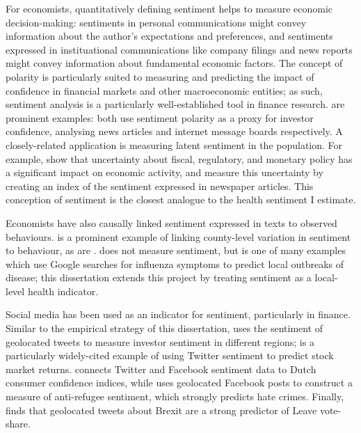 \documentclass[12pt,a4]{article}
\begin{document}
For economists, quantitatively defining sentiment helps to measure economic decision-making: sentiments in personal communications might convey information about the author's expectations and preferences, and sentiments expressed in instituational communications like company filings and news reports might convey information about fundamental economic factors. The concept of polarity is particularly suited to measuring and predicting the impact of confidence in financial markets and other macroeconomic entities; as such, sentiment analysis is a particularly well-established tool in finance research. \textcite{tetlockGivingContentInvestor2007a,antweilerAllThatTalk2004} are prominent examples: both use sentiment polarity as a proxy for investor confidence, analysing news articles and internet message boards respectively. A closely-related application is measuring latent sentiment in the population. For example, \textcite{bakerMeasuringEconomicPolicy2016} show that uncertainty about fiscal, regulatory, and monetary policy has a significant impact on economic activity, and measure this uncertainty by creating an index of the sentiment expressed in newspaper articles. This conception of sentiment is the closest analogue to the health sentiment I estimate.

Economists have also causally linked sentiment expressed in texts to observed behaviours. \textcite{stephens-davidowitzCostRacialAnimus2014} is a prominent example of linking county-level variation in sentiment to behaviour, as are \textcite{choiPredictingPresentGoogle2012,saizProxyingUnobservableVariables2013}. \textcite{ginsbergDetectingInfluenzaEpidemics2009} does not measure sentiment, but is one of many examples which use Google searches for influenza symptoms to predict local outbreaks of disease; this dissertation extends this project by treating sentiment as a local-level health indicator. 

Social media has been used as an indicator for sentiment, particularly in finance. Similar to the empirical strategy of this dissertation, \textcite{affusoSocialMediaSentiment2019} uses the sentiment of geolocated tweets to measure investor sentiment in different regions; \textcite{bollenTwitterMoodPredicts2011} is a particularly widely-cited example of using Twitter sentiment to predict stock market returns. \textcite{daasSocialMediaSentiment2014} connects Twitter and Facebook sentiment data to Dutch consumer confidence indices, while \textcite{mullerFanningFlamesHate2020} uses geolocated Facebook posts to construct a measure of anti-refugee sentiment, which strongly predicts hate crimes. Finally, \textcite{gorodnichenkoSocialMediaSentiment2018} finds that geolocated tweets about Brexit are a strong predictor of Leave vote-share.
\end{document}
